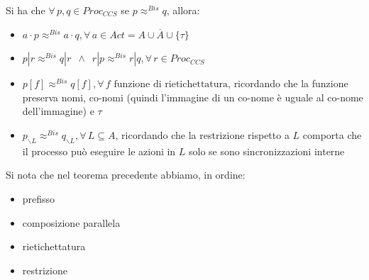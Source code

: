 \documentclass[a4paper,12pt, oneside]{book}
\begin{document}
\begin{teorema}
  Si ha che $\forall\,p,q\in Proc_{CCS}$ se $p\approx^{Bis}q$, allora:
  \begin{itemize}
    \item $a\cdot p\approx^{Bis} a\cdot q,\forall\, a\in
    Act=A\cup\overline{A}\cup\{\tau\}$ 
    \item $p|r\approx^{Bis}q|r\,\,\,\land \,\,\,
    r|p\approx^{Bis}r|q,\forall\,r\in Proc_{CCS}$  
    \item $p[f]\approx^{Bis}q[f],\forall\,f\mbox{ funzione di rietichettatura}$,
    ricordando che la funzione preserva nomi, co-nomi (quindi l'immagine di un
    co-nome è uguale al co-nome dell'immagine) e $\tau$
    \item $p_{\backslash L}\approx^{Bis}q_{\backslash L},\forall\,L\subseteq A$,
    ricordando che la restrizione rispetto a $L$ comporta che il processo può
    eseguire le azioni in $L$ solo se sono sincronizzazioni interne
  \end{itemize}
\end{teorema}
Si nota che nel teorema precedente abbiamo, in ordine:
\begin{itemize}
  \item prefisso
  \item composizione parallela
  \item rietichettatura
  \item restrizione
\end{itemize}
\end{document}
